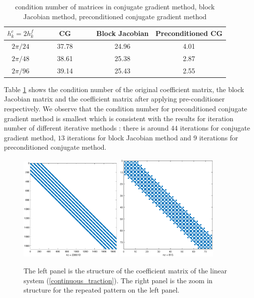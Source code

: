 \begin{table}[htbp]
	\begin{center}
		\begin{tabular}{|c|c c c|}
			\hline
			$h^c_k = 2h^f_k$   & ~~~~ CG ~~~~& Block Jacobian & Preconditioned CG  \\
			\hline
			$2\pi/24$ &37.78& 24.96& 4.01\\
			\hline
			$2\pi/48$ &38.61 & 25.38 & 2.87\\
			\hline 
			$2\pi/96$ &39.14 &25.43 & 2.55\\
			\hline
		\end{tabular}
	\end{center}
	\caption{condition number of matrices in conjugate gradient method, block Jacobian method, preconditioned conjugate gradient method}\label{condition_number}
\end{table} 
Table \ref{condition_number} shows the condition number of the original coefficient matrix, the block Jacobian matrix and the coefficient matrix after applying pre-conditioner respectively. We observe that the condition number for preconditioned conjugate gradient method is smallest which is consistent with the results for iteration number of different iterative methods : there is around $44$ iterations for conjugate gradient method, $13$ iterations for block Jacobian method and $9$ iterations for preconditioned conjugate method.

\begin{figure}[H]
	\centering
	\includegraphics[width=0.45\textwidth,trim={1.2cm 1cm 1.4cm 1.2cm}, clip]{Mass_matrix.eps}
	\includegraphics[width=0.45\textwidth,trim={1.2cm 1cm 1.4cm 1.2cm}, clip]{Mass_diagonal_matrix.eps}
	\caption{The left panel is the structure of the coefficient matrix of the linear system (\ref{continuous_traction}). The right panel is the zoom in structure for the repeated pattern on the left panel.}\label{Mass_matrix}
\end{figure}
